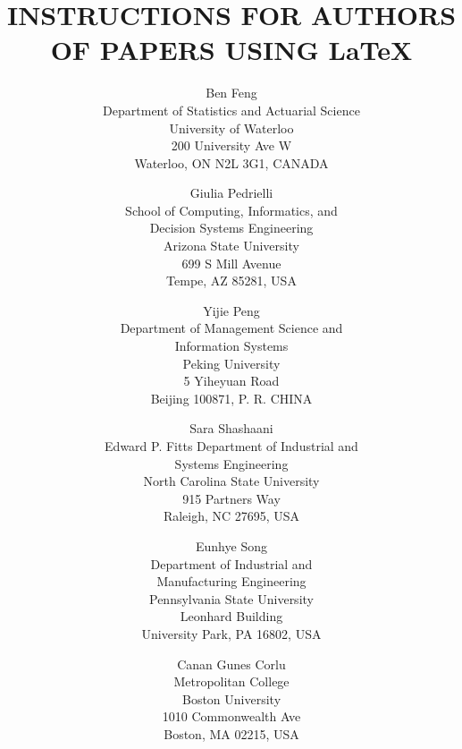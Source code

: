 \documentclass{wscpaperproc}
\theoremstyle{wsc}
\begin{document}
%
%

\title{INSTRUCTIONS FOR AUTHORS OF PAPERS USING \LaTeX}

\author{Ben Feng\\[12pt]
	Department of Statistics and Actuarial Science\\
	University of Waterloo\\
	200 University Ave W\\
	Waterloo, ON N2L 3G1, CANADA\\
\and
Giulia Pedrielli\\[12pt]
School of Computing, Informatics, and\\
Decision Systems Engineering\\
Arizona State University\\
699 S Mill Avenue\\
Tempe, AZ 85281, USA\\
\and
Yijie Peng\\ [12pt]
Department of Management Science and\\
Information Systems\\
Peking University\\
5 Yiheyuan Road\\
Beijing 100871, P. R. CHINA\\
\and
Sara Shashaani\\ [12pt]
Edward P. Fitts Department of Industrial and\\
Systems Engineering\\
North Carolina State University\\
915 Partners Way\\
Raleigh, NC 27695, USA\\
\and
Eunhye Song\\ [12pt]
Department of Industrial and\\Manufacturing Engineering\\
Pennsylvania State University\\
Leonhard Building\\
University Park, PA 16802, USA\\
\and
Canan Gunes Corlu\\[12pt]
Metropolitan College\\
Boston University\\
1010 Commonwealth Ave\\
Boston, MA 02215, USA\\
}
\end{document}
